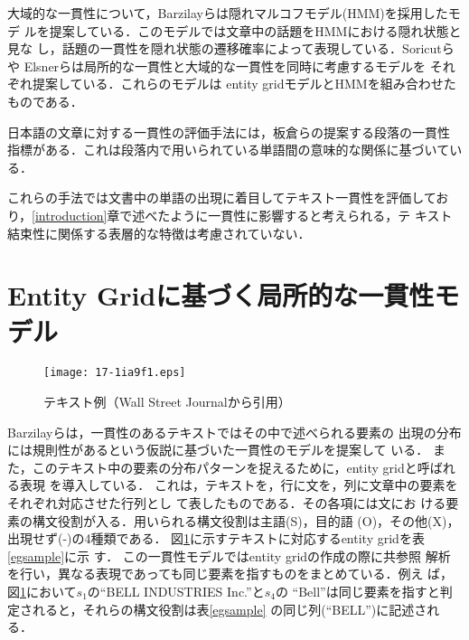 \documentclass[japanese]{jnlp_1.4}
\begin{document}
 大域的な一貫性について，Barzilayら\cite{barzilay2004}は隠れマルコフモデル(HMM)を採用したモデ
 ルを提案している．このモデルでは文章中の話題をHMMにおける隠れ状態と見な
 し，話題の一貫性を隠れ状態の遷移確率によって表現している．Soricutら\cite{soricut2006}や
 Elsnerら\cite{elsner2007}は局所的な一貫性と大域的な一貫性を同時に考慮するモデルを
 それぞれ提案している．これらのモデルは
 entity gridモデルとHMMを組み合わせたものである．

 日本語の文章に対する一貫性の評価手法には，板倉ら\cite{itakura2008}の提案する段落の一貫性
 指標がある．これは段落内で用いられている単語間の意味的な関係に基づいている．

 これらの手法では文書中の単語の出現に着目してテキスト一貫性を評価してお
 り，\ref{introduction}章で述べたように一貫性に影響すると考えられる，テ
 キスト結束性に関係する表層的な特徴は考慮されていない．



 \section{Entity Gridに基づく局所的な一貫性モデル}

\begin{figure}[b]
   \begin{center}
\texttt{[image: 17-1ia9f1.eps]}
   \end{center}
    \caption{テキスト例（Wall Street Journalから引用）}
\label{sample}
  \end{figure}
  \begin{table}[b]
    \caption{図\ref{sample}のテキストに対するentity grid}\label{egsample}

  \end{table}  


 Barzilayら\cite{barzilay2008}は，一貫性のあるテキストではその中で述べられる要素の
 出現の分布には規則性があるという仮説に基づいた一貫性のモデルを提案して
 いる．
 また，このテキスト中の要素の分布パターンを捉えるために，entity gridと呼ばれる表現
 を導入している．
 これは，テキストを，行に文を，列に文章中の要素をそれぞれ対応させた行列とし
 て表したものである．その各項には文にお
 ける要素の構文役割が入る．用いられる構文役割は主語(S)，目的語
 (O)，その他(X)，出現せず(-)の4種類である．
 図\ref{sample}に示すテキストに対応するentity gridを表\ref{egsample}に示
 す．
 この一貫性モデルではentity gridの作成の際に共参照
 解析を行い，異なる表現であっても同じ要素を指すものをまとめている．例え
 ば，図\ref{sample}において$s_1$の``BELL INDUSTRIES Inc.''と$s_4$の
 ``Bell''は同じ要素を指すと判定されると，それらの構文役割は表\ref{egsample}
 の同じ列(``BELL'')に記述される．
\end{document}
